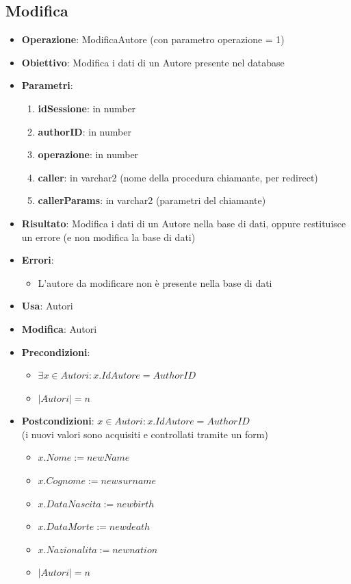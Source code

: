 \documentclass[a4paper,11pt]{article}
\begin{document}
\subsection{Modifica}
\begin{itemize}
	\item \textbf{Operazione}: ModificaAutore (con parametro operazione = 1)
	\item \textbf{Obiettivo}: Modifica i dati di un Autore presente nel database
	\item \textbf{Parametri}:
	\begin{enumerate}
		\item \textbf{idSessione}: in number
		\item \textbf{authorID}: in number
		\item \textbf{operazione}: in number
		\item \textbf{caller}: in varchar2 (nome della procedura chiamante, per redirect)
		\item \textbf{callerParams}: in varchar2 (parametri del chiamante)
	\end{enumerate}
	\item \textbf{Risultato}: Modifica i dati di un Autore nella base di dati, oppure restituisce un errore (e non modifica la base di dati)
	\item \textbf{Errori}: 
	\begin{itemize}
		\item L'autore da modificare non è presente nella base di dati
	\end{itemize}
	\item \textbf{Usa}: Autori
	\item \textbf{Modifica}: Autori
	\item \textbf{Precondizioni}:
	\begin{itemize}
		\item $\exists x \in Autori : x.IdAutore = AuthorID$
		\item $|Autori| = n$
	\end{itemize}
	\item \textbf{Postcondizioni}: $x \in Autori : x.IdAutore = AuthorID$ \\
	(i nuovi valori sono acquisiti e controllati tramite un form)
	\begin{itemize}
		\item $x.Nome := newName$
		\item $x.Cognome := newsurname$
		\item $x.DataNascita := newbirth$
		\item $ x.DataMorte := newdeath$
		\item $x.Nazionalita := newnation$
		\item $|Autori| = n$
	\end{itemize}
\end{itemize}
\end{document}
